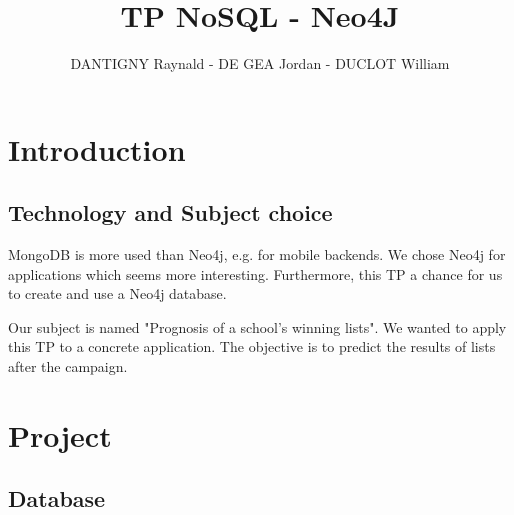 \documentclass[a4paper,oneside,1pt]{article}
\title{TP NoSQL - Neo4J}
\author{DANTIGNY Raynald - DE GEA Jordan - DUCLOT William}
\begin{document}




\maketitle

\section{Introduction}

\subsection{Technology and Subject choice}

MongoDB is more used than Neo4j, e.g. for mobile backends. We chose Neo4j for applications which seems more interesting. Furthermore, this TP a chance for us to create and use a Neo4j database. 
\linebreak

Our subject is named "Prognosis of a school's winning lists". We wanted to apply this TP to a concrete application. The objective is to predict the results of lists after the campaign. 

\section{Project}

\subsection{Database}
\end{document}
